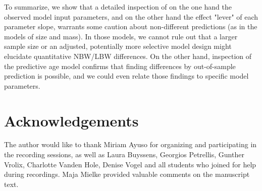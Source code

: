 \begin{change}
To summarize, we show that a detailed inspection of on the one hand the observed model input parameters, and on the other hand the effect "lever" of each parameter slope, warrants some caution about non-different predictions (as in the models of size and mass).
In those models, we cannot rule out that a larger sample size or an adjusted, potentially more selective model design might elucidate quantitative NBW/LBW differences.
On the other hand, inspection of the predictive age model confirms that finding differences by out-of-sample prediction is possible, and we could even relate those findings to specific model parameters.

\end{change}






\FloatBarrier
\clearpage
\section{Acknowledgements}
\label{sec:org2d8bfbc}
The author would like to thank Miriam Ayuso for organizing and participating in the recording sessions, as well as Laura Buyssens, Georgios Petrellis, Gunther Vrolix, Charlotte Vanden Hole, Denise Vogel and all students who joined for help during recordings.
Maja Mielke provided valuable comments on the manuscript text.


\FloatBarrier
\clearpage
% 
% 
